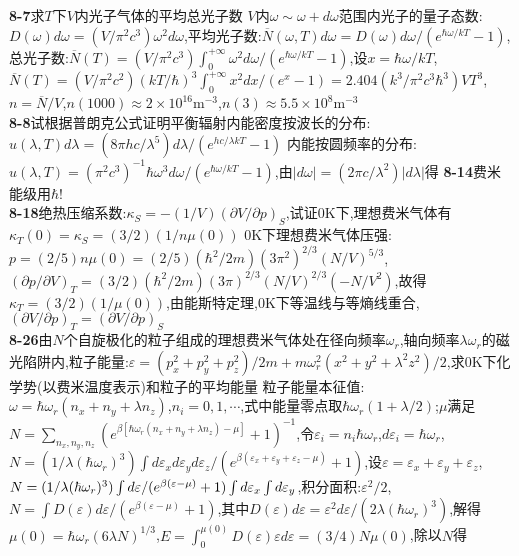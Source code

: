 \documentclass[10pt,a4paper]{article}
\begin{document}
\begin{multicols}{2}
\textbf{8-7}求$T$下$V$内光子气体的平均总光子数\quad\quad
$V$内$\omega\sim\omega+d\omega$范围内光子的量子态数:$D(\omega)d\omega=(V/\pi^2c^3)\omega^2d\omega$,平均光子数:$\overline{N}(\omega,T)d\omega=D(\omega)d\omega/(e^{\hbar\omega/kT}-1)$,总光子数:$\overline{N}(T)=(V/\pi^2c^3)\int_0^{+\infty}\omega^2d\omega/(e^{\hbar\omega/kT}-1)$,设$x=\hbar\omega/kT$,$\overline{N}(T)=(V/\pi^2c^2)(kT/\hbar)^3\int_0^{+\infty}x^2dx/(e^x-1)=2.404(k^3/\pi^2c^3\hbar^3)VT^3$,$n=\overline{N}/V$,$n(1000)\approx2\times10^{16}$m$^{-3}$,$n(3)\approx5.5\times10^8$m$^{-3}$\\
\textbf{8-8}试根据普朗克公式证明平衡辐射内能密度按波长的分布:$u(\lambda,T)d\lambda=(8\pi hc/\lambda^5)d\lambda/(e^{hc/\lambda kT}-1)$\quad\quad
内能按圆频率的分布:$u(\lambda,T)=(\pi^2c^3)^{-1}\hbar\omega^3d\omega/(e^{\hbar\omega/kT}-1)$,由$|d\omega|=(2\pi c/\lambda^2)|d\lambda|$得\quad
\textbf{8-14}费米能级用$\hbar$!\\
\textbf{8-18}绝热压缩系数:$\kappa_S=-(1/V)(\partial V/\partial p)_S$,试证$0$K下,理想费米气体有$\kappa_T(0)=\kappa_S=(3/2)(1/n\mu(0))$\quad\quad
$0$K下理想费米气体压强:$p=(2/5)n\mu(0)=(2/5)(\hbar^2/2m)(3\pi^2)^{2/3}(N/V)^{5/3}$,$(\partial p/\partial V)_T=(3/2)(\hbar^2/2m)(3\pi)^{2/3}(N/V)^{2/3}(-N/V^2)$,故得$\kappa_T=(3/2)(1/\mu(0))$,由能斯特定理,$0$K下等温线与等熵线重合,$(\partial V/\partial p)_T=(\partial V/\partial p)_S$\\
\textbf{8-26}由$N$个自旋极化的粒子组成的理想费米气体处在径向频率$\omega_r$,轴向频率$\lambda\omega_r$的磁光陷阱内,粒子能量:$\varepsilon=(p_x^2+p_y^2+p_z^2)/2m+m\omega_r^2(x^2+y^2+\lambda^2z^2)/2$,求$0$K下化学势(以费米温度表示)和粒子的平均能量\quad\quad
粒子能量本征值:$\omega=\hbar\omega_r(n_x+n_y+\lambda n_z)$,$n_i=0,1,\cdots$,式中能量零点取$\hbar\omega_r(1+\lambda/2)$;$\mu$满足$N=\sum_{n_x,n_y,n_z}(e^{\beta[\hbar\omega_r(n_x+n_y+\lambda n_z)-\mu]}+1)^{-1}$,令$\varepsilon_i=n_i\hbar\omega_r$,$d\varepsilon_i=\hbar\omega_r$,$N=(1/\lambda(\hbar\omega_r)^3)\int d\varepsilon_xd\varepsilon_yd\varepsilon_z/(e^{\beta(\varepsilon_x+\varepsilon_y+\varepsilon_z-\mu)}+1)$,设$\varepsilon=\varepsilon_x+\varepsilon_y+\varepsilon_z$,$N=(1/\lambda(\hbar\omega_r)^3)\\\int d\varepsilon/(e^{\beta(\varepsilon-\mu)}+1)\int d\varepsilon_x\int d\varepsilon_y$,积分面积:$\varepsilon^2/2$,$N=\int D(\varepsilon)d\varepsilon/(e^{\beta(\varepsilon-\mu)}+1)$,其中$D(\varepsilon)d\varepsilon=\varepsilon^2d\varepsilon/(2\lambda(\hbar\omega_r)^3)$,解得$\mu(0)=\hbar\omega_r(6\lambda N)^{1/3}$,$E=\int_0^{\mu(0)}D(\varepsilon)\varepsilon d\varepsilon=(3/4)N\mu(0)$,除以$N$得\\

\end{multicols}
\end{document}
